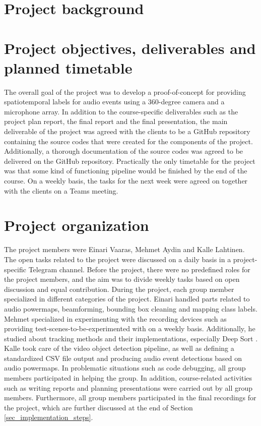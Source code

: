 \section{Project background}


\section{Project objectives, deliverables and planned timetable}

The overall goal of the project was to develop a proof-of-concept for providing spatiotemporal labels for audio events using a 360-degree camera and a microphone array. In addition to the course-specific deliverables such as the project plan report, the final report and the final presentation, the main deliverable of the project was agreed with the clients to be a GitHub repository containing the source codes that were created for the components of the project. Additionally, a thorough documentation of the source codes was agreed to be delivered on the GitHub repository. Practically the only timetable for the project was that some kind of functioning pipeline would be finished by the end of the course. On a weekly basis, the tasks for the next week were agreed on together with the clients on a Teams meeting.

\section{Project organization}

The project members were Einari Vaaras, Mehmet Aydin and Kalle Lahtinen. The open tasks related to the project were discussed on a daily basis in a project-specific Telegram channel. Before the project, there were no predefined roles for the project members, and the aim was to divide weekly tasks based on open discussion and equal contribution. During the project, each group member specialized in different categories of the project. Einari handled parts related to audio powermaps, beamforming, bounding box cleaning and mapping class labels. Mehmet specialized in experimenting with the recording devices such as providing test-scenes-to-be-experimented with on a weekly basis. Additionally, he studied about tracking methods and their implementations, especially Deep Sort . Kalle took care of the video object detection pipeline, as well as defining a standardized CSV file output and producing audio event detections based on audio powermaps. In problematic situations such as code debugging, all group members participated in helping the group. In addition, course-related activities such as writing reports and planning presentations were carried out by all group members. Furthermore, all group members participated in the final recordings for the project, which are further discussed at the end of Section \ref{sec_implementation_steps}.


